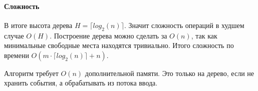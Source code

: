 \documentclass[12pt]{article}
\begin{document}
%
%


\paragraph{Сложность}

В итоге высота дерева $ H = \lceil log_2(n) \rceil $. Значит сложность
операций в худшем случае $ O(H) $. Построение дерева можно сделать за
$ O(n) $, так как минимальные свободные места находятся тривиально.
Итого сложность по времени $ O(m \cdot \lceil log_2(n) \rceil + n) $.

Алгоритм требует $ O(n) $ дополнительной памяти. Это только на дерево,
если не хранить события, а обрабатывать из потока ввода.
\end{document}
